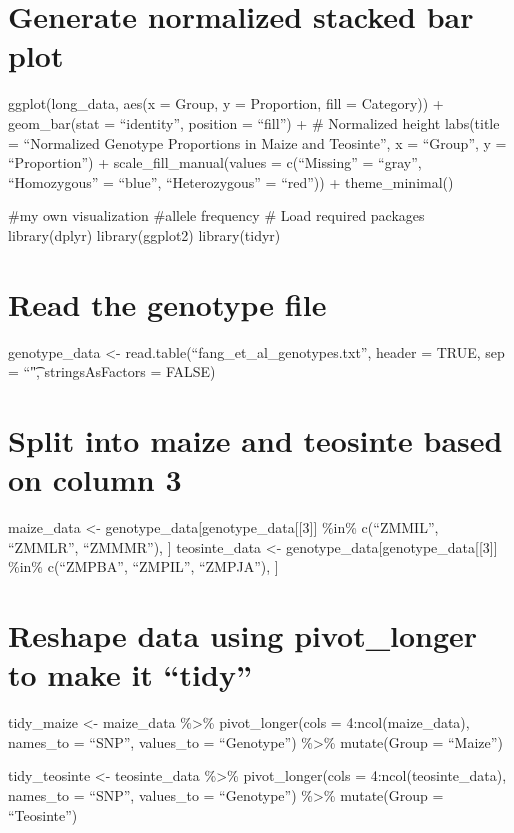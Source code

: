 \documentclass[
]{article}
\begin{document}
\section{Generate normalized stacked bar
plot}\label{generate-normalized-stacked-bar-plot}

ggplot(long\_data, aes(x = Group, y = Proportion, fill = Category)) +
geom\_bar(stat = ``identity'', position = ``fill'') + \# Normalized
height labs(title = ``Normalized Genotype Proportions in Maize and
Teosinte'', x = ``Group'', y = ``Proportion'') +
scale\_fill\_manual(values = c(``Missing'' = ``gray'', ``Homozygous'' =
``blue'', ``Heterozygous'' = ``red'')) + theme\_minimal()

\#my own visualization \#allele frequency \# Load required packages
library(dplyr) library(ggplot2) library(tidyr)

\section{Read the genotype file}\label{read-the-genotype-file-1}

genotype\_data \textless- read.table(``fang\_et\_al\_genotypes.txt'',
header = TRUE, sep = ``\t", stringsAsFactors = FALSE)

\section{Split into maize and teosinte based on column
3}\label{split-into-maize-and-teosinte-based-on-column-3-1}

maize\_data \textless- genotype\_data{[}genotype\_data{[}{[}3{]}{]}
\%in\% c(``ZMMIL'', ``ZMMLR'', ``ZMMMR''), {]} teosinte\_data \textless-
genotype\_data{[}genotype\_data{[}{[}3{]}{]} \%in\% c(``ZMPBA'',
``ZMPIL'', ``ZMPJA''), {]}

\section{Reshape data using pivot\_longer to make it
``tidy''}\label{reshape-data-using-pivot_longer-to-make-it-tidy}

tidy\_maize \textless- maize\_data \%\textgreater\% pivot\_longer(cols =
4:ncol(maize\_data), names\_to = ``SNP'', values\_to = ``Genotype'')
\%\textgreater\% mutate(Group = ``Maize'')

tidy\_teosinte \textless- teosinte\_data \%\textgreater\%
pivot\_longer(cols = 4:ncol(teosinte\_data), names\_to = ``SNP'',
values\_to = ``Genotype'') \%\textgreater\% mutate(Group = ``Teosinte'')
\end{document}
